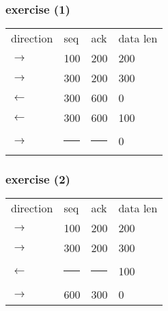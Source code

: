 \begin{frame}
\frametitle{exercise (1)}
\begin{tabular}{llll}
direction & seq & ack & data len \\
$\rightarrow$ & 100 & 200 & 200\\
$\rightarrow$ & 300 & 200 & 300 \\
$\leftarrow$ & 300 & 600 & 0 \\
$\leftarrow$ & 300 & 600 & 100 \\
$\rightarrow$ & \rule{3cm}{1pt} & \rule{3cm}{1pt} & 0 \\
\end{tabular}
\end{frame}

\begin{frame}
\frametitle{exercise (2)}
\begin{tabular}{llll}
direction & seq & ack & data len \\
$\rightarrow$ & 100 & 200 & 200\\
$\rightarrow$ & 300 & 200 & 300 \\
$\leftarrow$ & \rule{3cm}{1pt} & \rule{3cm}{1pt} & 100 \\
$\rightarrow$ & 600 & 300 & 0 \\
\end{tabular}
\end{frame}
